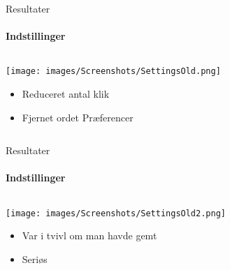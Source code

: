 \begin{frame}{Resultater}
\framesubtitle{Indstillinger}


	
	\begin{minipage}[0.3\textheight]{\textwidth}
	\begin{columns}[T]
	\begin{column}{1\textwidth}
	
	\vspace{-15 pt}
	 \texttt{[image: images/Screenshots/SettingsOld.png]}
	 
	 \begin{itemize}
	 		 	\item Reduceret antal klik
	 		 	\item Fjernet ordet Præferencer
	 \end{itemize}
	
	\end{column}

	\end{columns}

  \end{minipage}
	
\end{frame}
\begin{frame}{Resultater}
\framesubtitle{Indstillinger}


	
	\begin{minipage}[0.3\textheight]{\textwidth}
	\begin{columns}[T]
	\begin{column}{1\textwidth}
	\vspace{-15 pt}
	 \texttt{[image: images/Screenshots/SettingsOld2.png]}
	 
	 \begin{itemize}
	 	 	\item Var i tvivl om man havde gemt
	 	 	\item Seriøs
	 \end{itemize}
	
	\end{column}

	\end{columns}

  \end{minipage}
	
\end{frame}

